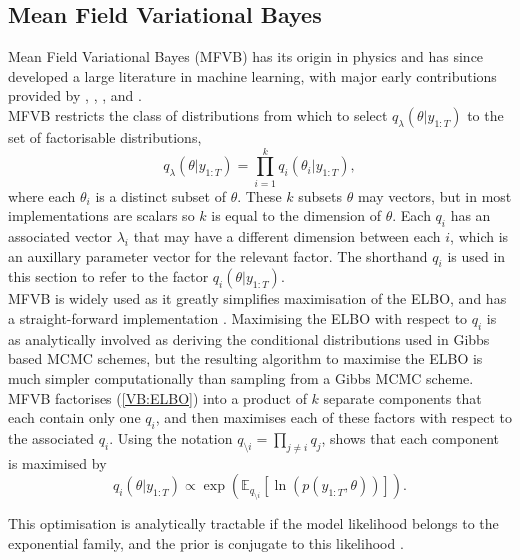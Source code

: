 \documentclass[
12pt, %
onehalfspacing, %
nohyperref, %
headsepline, %
chapterinoneline, %
]{MastersDoctoralThesis} %
\begin{document}
\subsection{Mean Field Variational Bayes} \label{subsec:MFVB}

Mean Field Variational Bayes (MFVB) has its origin in physics \citep{Chandler1987, Peterson1987} and has since developed a large literature in machine learning, with major early contributions provided by \citet{Jordan1999}, \citet{Ghahramani2000a}, \citet{Beal2003}, and \citet{Wainwright2008}.
\\

MFVB restricts the class of distributions from which to select $q_{\lambda}(\theta | y_{1:T})$ to the set of factorisable distributions,
\begin{equation}
\label{MFVB:Product}
q_{\lambda}(\theta | y_{1:T}) = \prod_{i=1}^k q_i(\theta_i | y_{1:T}),
\end{equation}
where each $\theta_i$ is a distinct subset of $\theta$. These $k$ subsets  $\theta$ may vectors, but in most implementations are scalars so $k$ is equal to the dimension of $\theta$. Each $q_i$ has an associated vector $\lambda_i$ that may have a different dimension between each $i$, which is an auxillary parameter vector for the relevant factor. The shorthand $q_i$ is used in this section to refer to the factor $q_i(\theta | y_{1:T})$. 
\\

MFVB is widely used as it greatly simplifies maximisation of the ELBO, and has a straight-forward implementation \citep{Wainwright2008}.  Maximising the ELBO with respect to $q_i$ is as analytically involved as deriving the conditional distributions used in Gibbs based MCMC schemes, but the resulting algorithm to maximise the ELBO is much simpler computationally than sampling from a Gibbs MCMC scheme. MFVB factorises (\ref{VB:ELBO}) into a product of $k$ separate components that each contain only one $q_i$, and then maximises each of these factors with respect to the associated $q_i$. Using the notation $q_{\setminus i} = \prod_{j\neq i}q_j$, \citet{Attias1999} shows that each component is maximised by
\begin{equation}
\label{MFVB:solution}
q_i(\theta | y_{1:T}) \propto\exp( \mathbb{E}_{q_{\setminus i}} [\ln(p(y_{1:T},\theta))]).
\end{equation}

This optimisation is analytically tractable if the model likelihood belongs to the exponential family, and the prior is conjugate to this likelihood \citep{Beal2003}.
\\
\end{document}
